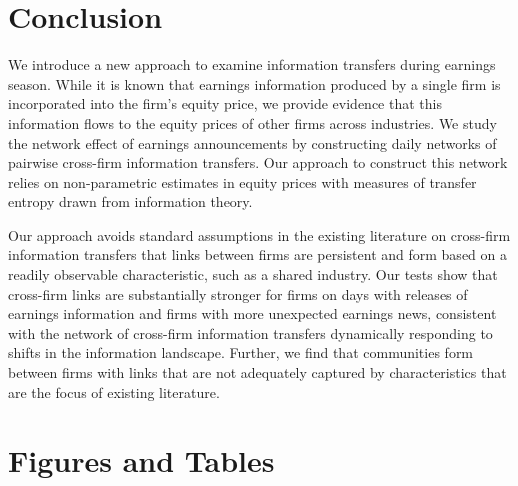 \section{Conclusion}

We introduce a new approach to examine information transfers during earnings season.   While it is known that earnings information produced by a single firm is incorporated into the firm's equity price,  we provide evidence that this information flows to the equity prices of other firms across industries.  We study the network effect of earnings announcements by constructing daily networks of pairwise cross-firm information transfers.  Our approach to construct this network relies on non-parametric estimates in equity prices with measures of transfer entropy drawn from information theory. 

Our approach avoids standard assumptions in the existing literature on cross-firm information transfers that links between firms are persistent and form based on a readily observable characteristic,  such as a shared industry.  Our tests show that cross-firm links are substantially stronger for firms on days with releases of earnings information and firms with more unexpected earnings news, consistent with the network of cross-firm information transfers dynamically responding to shifts in the information landscape.  Further,  we find that communities form between firms with links that are not adequately captured by characteristics that are the focus of existing literature. 





\newpage
\section{Figures and Tables}

